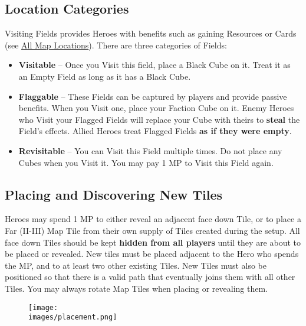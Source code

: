 \begin{multicols}{2}

\subsection*{\hypertarget{Categories}{Location Categories}}
Visiting Fields provides Heroes with benefits such as gaining Resources or Cards (see \hyperlink{All}{All Map Locations}).
There are three categories of Fields:
\begin{itemize}
  \item \textbf{Visitable} – Once you Visit this field, place a Black Cube on it.
    Treat it as an Empty Field as long as it has a Black Cube.
  \item \textbf{Flaggable} – These Fields can be captured by players and provide passive benefits.
    When you Visit one, place your Faction Cube on it.
    Enemy Heroes who Visit your Flagged Fields will replace your Cube with theirs to \textbf{steal} the Field’s effects.
    Allied Heroes treat Flagged Fields \textbf{as if they were empty}.
  \item \textbf{Revisitable} – You can Visit this Field multiple times.
    Do not place any Cubes when you Visit it.
    You may pay 1 MP to Visit this Field again.
\end{itemize}

\subsection*{\hypertarget{Placing}{Placing and Discovering New Tiles}}
Heroes may spend 1 MP to either reveal an adjacent face down Tile, or to place a Far (II-III) Map Tile from their own supply of Tiles created during the setup.
All face down Tiles should be kept \textbf{hidden from all players} until they are about to be placed or revealed.
New tiles must be placed adjacent to the Hero who spends the MP, and to at least two other existing Tiles.
New Tiles must also be positioned so that there is a valid path that eventually joins them with all other Tiles.
You may always rotate Map Tiles when placing or revealing them.

\medskip
{}

\end{multicols}

\begin{figure*}[!hb]
  \centering
  \texttt{[image: \\images/placement.png]}
\end{figure*}

